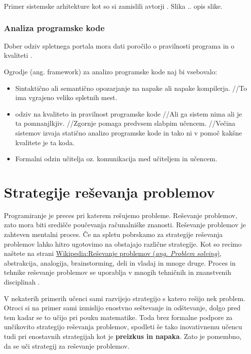 Primer sistemske arhitekture kot so si zamislili avtorji
\cite{ITaLCP_DistanceEdu}. Slika .. opis slike.


\subsubsection{Analiza programske kode}
\label{sec:analiza_programske_kode}


Dober odziv spletnega portala mora dati poročilo o pravilnosti programa in o
kvaliteti \cite{thesisAWebP}.

Ogrodje (ang. framework) za analizo programske kode naj bi vsebovalo:

\begin{itemize}
\item
  Sintaktično ali semantično opozarjanje na napake ali napake
  kompilerja. //To ima vgrajeno veliko spletnih mest.
\item
  odziv na kvaliteto in pravilnost programske kode //Ali ga sistem nima
  ali je ta pomnanjlkjiv. //Zgornje pomaga predvsem slabpim učencem.
  //Večina sistemov izvaja statično analizo programske kode in tako ni v
  pomoč kakšne kvalitete je ta koda.
\item
  Formalni odzin učitelja oz. komunikacija med učiteljem in učencem.
\end{itemize}

\section{Strategije reševanja problemov}
\label{sec:strategije_reševanja_problemov}

Programiranje je preces pri katerem rešujemo probleme. Reševanje
problemov, zato mora biti središče poučevanja računalniške
znanosti. Reševanje problemov je zahteven mentalni proces. Če na
spletu pobrskamo za strategije reševanja problemov lahko hitro
ugotovimo na obstajajo različne strategije. Kot so recimo naštete na
strani
\href{https://en.wikipedia.org/wiki/Problem_solving#Problem-solving_strategies}{Wikipedia:Reševanje
  problemov (\emph{ang. Problem solving})}, abstrakcija, analogija,
brainstorming, deli in vladaj in mnoge druge.  Proces in tehnike
reševanje problemov se uporablja v mnogih tehničnih in znanstvenih
disciplinah \cite{guideTCS}.

V nekaterih primerih učenci sami razvijejo strategijo s katero rešijo
nek problem. Otroci si na primer sami izmislijo enostvno seštevanje in
odštevanje, dolgo pred tem kadar se to učijo pri pouku
matematike. Toda brez formalne podpore za unčikovito strategijo
reševanja problemov, spodleti še tako inovativnemu učencu tudi pri
enostavnih strategijah kot je \textbf{preizkus in napaka}. Zato je
pomembno, da se uči strategij za reševanje problemov.

